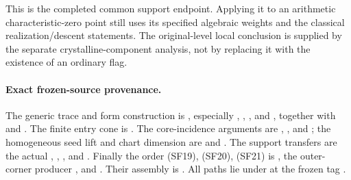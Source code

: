 This is the completed common support endpoint.
Applying it to an arithmetic characteristic-zero
point still uses its specified algebraic weights
and the classical realization/descent statements.
The original-level local conclusion
 is supplied by the separate
crystalline-component analysis, not by replacing
it with the existence of an ordinary flag.

\paragraph{Exact frozen-source provenance.}
The generic trace and form construction is
, especially
, ,
, and ,
together with
and .
The finite entry cone is .
The core-incidence arguments are
,
, and ;
the homogeneous seed lift and chart dimension are
 and .
The support transfers are the actual
,
,
, and
.
Finally the order (SF19), (SF20), (SF21) is
,
the outer-corner producer , and
.
Their assembly is
.
All paths lie under
at the frozen tag .
